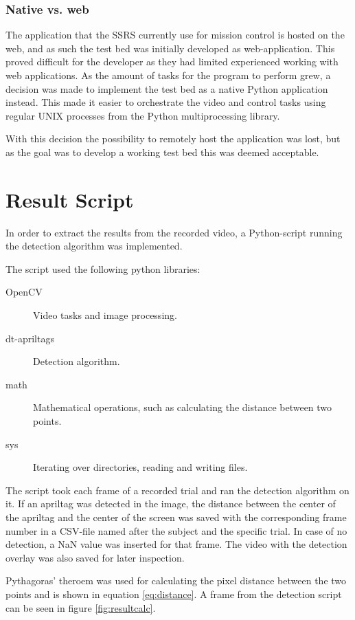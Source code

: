 \documentclass[nofilelist]{cslthse-msc}
\begin{document}
\subsubsection{Native vs. web}
The application that the SSRS currently use for mission control is hosted on the web, and as such the test bed was initially developed as web-application. This proved difficult for the developer as they had limited experienced working with web applications. As the amount of tasks for the program to perform grew, a decision was made to implement the test bed as a native Python application instead. This made it easier to orchestrate the video and control tasks using regular UNIX processes from the Python multiprocessing library. 

With this decision the possibility to remotely host the application was lost, but as the goal was to develop a working test bed this was deemed acceptable. 

\section{Result Script}
\label{sec:resultscript}
In order to extract the results from the recorded video, a Python-script running the detection algorithm was implemented. 

The script used the following python libraries:
\begin{description}
   \item[OpenCV] Video tasks and image processing.
   \item[dt-apriltags] Detection algorithm.
   \item[math] Mathematical operations, such as calculating the distance between two points.
   \item[sys] Iterating over directories, reading and writing files.  
\end{description}

The script took each frame of a recorded trial and ran the detection algorithm on it. If an apriltag was detected in the image, the distance between the center of the apriltag and the center of the screen was saved with the corresponding frame number in a CSV-file named after the subject and the specific trial. In case of no detection, a NaN value was inserted for that frame. The video with the detection overlay was also saved for later inspection.

Pythagoras' theroem was used for calculating the pixel distance between the two points and is shown in equation \ref{eq:distance}. A frame from the detection script can be seen in figure \ref{fig:resultcalc}.
\end{document}
